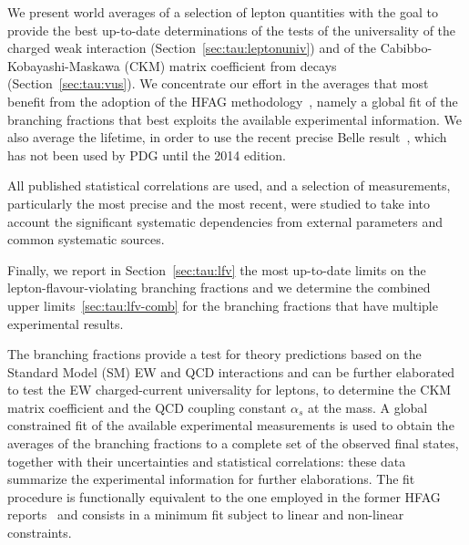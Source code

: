 We present world averages of a selection of \mtau lepton quantities with
the goal to provide the best up-to-date determinations of the tests of the
universality of the charged weak interaction
(Section~\ref{sec:tau:leptonuniv}) and of the Cabibbo-Kobayashi-Maskawa
(CKM) matrix coefficient \Vus from \mtau decays
(Section~\ref{sec:tau:vus}).  We concentrate our effort in the averages
that most benefit from the adoption of the HFAG
methodology~\cite{Asner:2010qj}, namely a global fit of the \mtau branching
fractions that best exploits the available experimental information. We
also average the \mtau lifetime, in order to use the recent precise Belle
result~\cite{Belous:2013dba}, which has not been used by PDG until the 2014
edition.

All published statistical correlations are used, and a selection of
measurements, particularly the most precise and the most recent, were
studied to take into account the significant systematic dependencies from
external parameters and common systematic sources.

Finally, we report in Section~\ref{sec:tau:lfv} the most up-to-date limits
on the lepton-flavour-violating \mtau branching fractions and we determine
the combined upper limits~\ref{sec:tau:lfv-comb} for the branching
fractions that have multiple experimental results.

\label{sec:tau:br-fit}

The \mtau branching fractions provide a test for theory predictions based
on the Standard Model (SM) EW and QCD interactions and can be further
elaborated to test the EW charged-current universality for leptons, to
determine the CKM matrix coefficient \Vus and the QCD coupling constant
$\alpha_s$ at the \mtau mass. A global constrained fit of the available
experimental measurements is used to obtain the averages of the \mtau
branching fractions to a complete set of the observed final states,
together with their uncertainties and statistical correlations: these data
summarize the experimental information for further elaborations.
\label{sec:tau:fit}
The fit procedure is functionally equivalent to the one employed in the
former HFAG reports~\cite{Asner:2010qj,Amhis:2012bh} and consists in a minimum \chisq
fit subject to linear and non-linear constraints.

